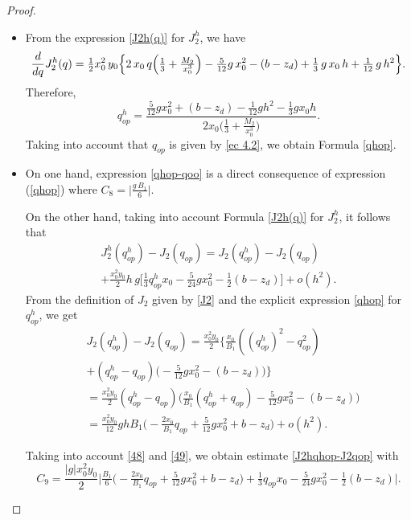 \documentclass[axioms,article,submit,moreauthors]{Definitions/mdpi}
\begin{document}
    
    
  \begin{proof}$ $
  \begin{itemize}
  \item[(a)] From the expression \eqref{J2h(q)} for ${J^h_2}$, we have
\begin{equation*}  
 { \frac{d}{dq} J^h_{2}(q)}= \tfrac{1}{2} x_0^2\, y_0 \Big\{ 2\,x_0 \,q \Big(\tfrac{1}{3} + \tfrac{M_2}{x_0^3} \Big) - \tfrac{5}{12} g \,x_0^2 - (b- z_d)  \\   
     +\tfrac{1}{3} \,g \,x_0\,  h+ \tfrac{1}{12} \,g \,h^2 \Big\}.
     \end{equation*} 
Therefore, \[{q^h_{op}}= \frac{\tfrac{5}{12} g x_0^2+ (b-z_d)-\tfrac{1}{12} gh^2-\tfrac{1}{3} g x_0 h}{2 x_0 \big(\tfrac{1}{3}+\tfrac{M_2}{x_0^3}\big)}.\]     
   Taking into account that $q_{op}$ is given by \eqref{ec 4.2}, we obtain Formula \eqref{qhop}.
  \item[(b)]

On one hand, expression \eqref{qhop-qoo} is a direct  consequence of expression (\ref{qhop}) where \mbox{$C_8=\Big| \tfrac{g\,  B_1}{6} \Big|.$}
     
On the other hand, taking into account Formula  \eqref{J2h(q)}  for ${J^h_2}$, it follows that
   \begin{equation}\label{48}
   \begin{array}{ll}
  {J^h_2}({q^h_{op}})- J_2(q_{op}) =J_2({q^h_{op}})-J_2(q_{op})\\[0.45cm]
  + \tfrac{x_0^2y_0}{2} h \,g  \Big[\tfrac{1}{3}{q^h_{op}} x_0 - \tfrac{5}{24} g x_0^2 - \tfrac{1}{2} (b-z_d)\Big] +o(h^2).
  \end{array}
\end{equation}  
  From the definition of $J_2$ given by \eqref{J2} and the explicit expression \eqref{qhop} for ${q^h_{op}}$, we get
  \begin{equation}\label{49}
  \begin{array}{lll}
 &J_2({q^h_{op}})-J_2(q_{op})=\tfrac{x_0^2 y_0}{2}\Big\{ \tfrac{x_0}{B_1}({(q^h_{op})}^2-q_{op}^2)\\[0.45cm]
 & +({q^h_{op}}-q_{op})\Big(-\tfrac{5}{12} g x_0^2-  (b-z_d)\Big)\Big\}\\[0.45cm]
 &=\tfrac{x_0^2 y_0}{2} ({q^h_{op}}-q_{op})\Big( \tfrac{x_0}{B_1}({q^h_{op}}+q_{op}) -\tfrac{5}{12} g x_0^2-  (b-z_d)\Big)\\[0.45cm]
 &=\tfrac{x_0^2 y_0}{12}g h B_1 \Big(-\tfrac{2x_0}{B_1} q_{op} +\tfrac{5}{12} g x_0^2+  b-z_d\Big) +o(h^2).
 \end{array}
  \end{equation}
  

  
 \noindent Taking into account \eqref{48} and \eqref{49}, we obtain estimate \eqref{J2hqhop-J2qop}   with  \[C_9=\frac{|g| x_0^2 y_0 }{2} \Big\lvert\tfrac{B_1}{6}\Big(-\tfrac{2x_0}{B_1}q_{op}+\tfrac{5 }{12}g x_0^2 +b-z_d \Big)+ \tfrac{1}{3}q_{{op}} x_0 - \tfrac{5}{24} g x_0^2 - \tfrac{1}{2} (b-z_d)\Big\rvert. \]

  \end{itemize}
  \end{proof}
\end{document}
